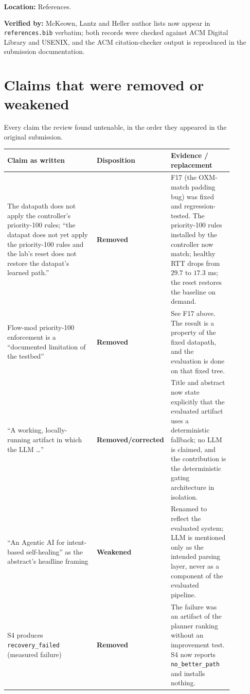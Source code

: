 \documentclass[11pt,a4paper]{article}
\begin{document}
\textbf{Location:} References.

\textbf{Verified by:}
McKeown, Lantz and Heller author lists now appear in \texttt{references.bib}
verbatim; both records were checked against ACM Digital Library and USENIX, and
the ACM citation-checker output is reproduced in the submission documentation.

\section{Claims that were removed or weakened}

Every claim the review found untenable, in the order they appeared in the
original submission.

\begin{longtable}{@{}p{0.42\linewidth}p{0.22\linewidth}p{0.28\linewidth}@{}}
\textbf{Claim as written} & \textbf{Disposition} & \textbf{Evidence / replacement} \\
\midrule
The datapath does not apply the controller's priority-100 rules; ``the
datapat does not yet apply the priority-100 rules and the lab's reset does not
restore the datapat's learned path.'' & \textbf{Removed} &
F17 (the OXM-match padding bug) was fixed and regression-tested. The
priority-100 rules installed by the controller now match; healthy RTT drops
from $29.7$ to $17.3$ ms; the reset restores the baseline on demand. \\
Flow-mod priority-100 enforcement is a ``documented limitation of the
testbed'' & \textbf{Removed} & See F17 above. The result is a property of the
fixed datapath, and the evaluation is done on that fixed tree. \\
``A working, locally-running artifact in which the LLM \ldots{}'' &
\textbf{Removed/corrected} & Title and abstract now state explicitly that the
evaluated artifact uses a deterministic fallback; no LLM is claimed, and the
contribution is the deterministic gating architecture in isolation. \\
``An Agentic AI for intent-based self-healing'' as the abstract's headline
framing & \textbf{Weakened} & Renamed to reflect the evaluated system; LLM is
mentioned only as the intended parsing layer, never as a component of the
evaluated pipeline. \\
S4 produces \texttt{recovery\_failed} (measured failure) & \textbf{Removed} &
The failure was an artifact of the planner ranking without an improvement test.
S4 now reports \texttt{no\_better\_path} and installs nothing. \\

\end{longtable}
\end{document}
